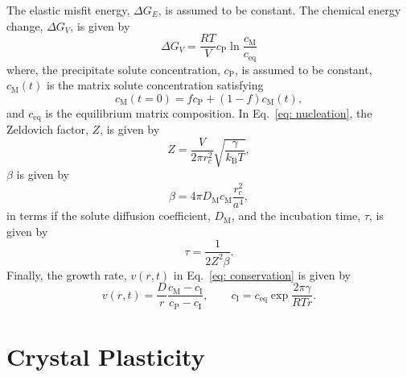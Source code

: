 \documentclass[11pt]{scrartcl}
\newcommand{\eref}[1]{Eq.~\eqref{#1}}
\newcommand{\kB}{\ensuremath{k_\text{B}}}
\begin{document}
%
The elastic misfit energy, $\Delta G_E$, is assumed to be constant. The chemical energy change, $\Delta G_V$, is given by
%
\begin{equation}
\label{eq: chemenergy}
\Delta G_V = \frac{R T}{V} c_\text{P} \ln{\frac{c_\text{M}}{c_\text{eq}}}
\end{equation}
%
where, the precipitate solute concentration, $c_\text{P}$, is assumed to be constant, $c_\text{M}\left(t\right)$ is the matrix solute concentration satisfying
%
\begin{equation}
\label{eq: soluteconservation}
c_\text{M}\left(t = 0\right) = f c_\text{P} + \left(1 - f\right)c_\text{M}\left(t\right),
\end{equation}
%
and $c_\text{eq}$ is the equilibrium matrix composition.
In \eref{eq: nucleation}, the Zeldovich factor, $Z$, is given by
%
\begin{equation}
\label{eq: soluteconservation}
Z = \frac{V}{2\pi r_c^2} \sqrt{\frac{\gamma}{\kB T}},
\end{equation}
%
$\beta$ is given by
%
\begin{equation}
\label{eq: beta}
\beta = 4\pi D_\text{M} c_\text{M} \frac{r_c^2}{a^4},  
\end{equation}
%
in terms if the solute diffusion coefficient, $D_\text{M}$, and the incubation time, $\tau$, is given by
%
\begin{equation}
\label{eq: incubation}
\tau = \frac{1}{2 Z^2 \beta}.
\end{equation}
%
Finally, the growth rate, $v\left(r,t\right)$ in \eref{eq: conservation} is given by
%
\begin{equation}
\label{eq: growth}
v\left(r,t\right) = \frac{D}{r} \frac{c_\text{M} - c_\text{I}}{c_\text{P} - c_\text{I}}, \qquad c_\text{I} = c_\text{eq} \exp{\frac{2\pi\gamma}{R T r}}.
\end{equation}
%

\section{Crystal Plasticity}
\end{document}
